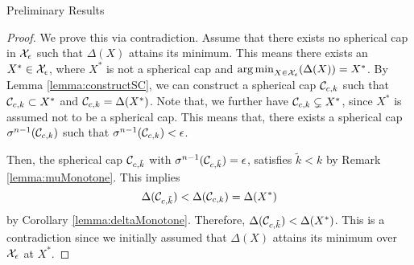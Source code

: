 \begin{subsection}{Preliminary Results}
\begin{proof}We prove this via contradiction. Assume that there exists no spherical cap in $\mathcal{X}_{\epsilon}$ such that $\Delta(X)$ attains its minimum. This means there exists an $X^* \in \mathcal{X}_{\epsilon}$, where $X^*$ is not a spherical cap and $\operatorname*{arg\,min}_{X \in \mathcal{X}_{\epsilon}}(\Delta(X))=X^*$. By Lemma \ref{lemma:constructSC}, we can construct a spherical cap $\mathcal{C}_{c,k}$ such that $\mathcal{C}_{c,k} \subset X^*$ and $\mathcal{C}_{c,k} = \Delta(X^*)$. Note that, we further have $\mathcal{C}_{c,k} \subsetneq X^*$, since $X^*$ is assumed not to be a spherical cap. This means that, there exists a spherical cap $\sigma^{n-1}(\mathcal{C}_{c,k})$ such that $\sigma^{n-1}(\mathcal{C}_{c,k}) < \epsilon$. 

Then, the spherical cap $\mathcal{C}_{c, \tilde{k}}$ with $\sigma^{n-1}(\mathcal{C}_{c, \tilde{k}}) = \epsilon$, satisfies $\tilde{k} < k$ by Remark \ref{lemma:muMonotone}. This implies $$\Delta(\mathcal{C}_{c, \tilde{k}}) < \Delta(\mathcal{C}_{c, k}) = \Delta(X^*)$$ by Corollary \ref{lemma:deltaMonotone}. Therefore, $\Delta(\mathcal{C}_{c, \tilde{k}}) < \Delta(X^*)$. This is a contradiction since we initially assumed that $\Delta(X)$ attains its minimum over $\mathcal{X}_{\epsilon}$ at $X^*$.
\end{proof}
\end{subsection}

